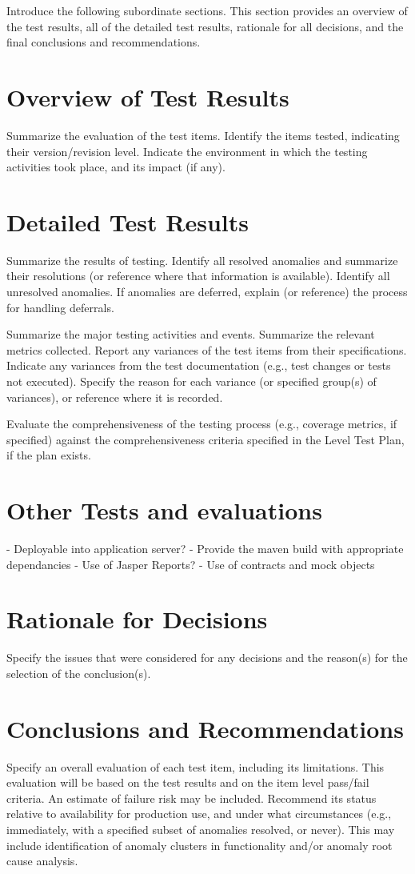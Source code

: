 Introduce the following subordinate sections. This section provides an overview of the test results, all
of the detailed test results, rationale for all decisions, and the final conclusions and recommendations.

\section{Overview of Test Results}
Summarize the evaluation of the test items. Identify the items tested, indicating their version/revision
level. Indicate the environment in which the testing activities took place, and its impact (if any).

\section{Detailed Test Results}
Summarize the results of testing. Identify all resolved anomalies and summarize their resolutions (or
reference where that information is available). Identify all unresolved anomalies. If anomalies are
deferred, explain (or reference) the process for handling deferrals.\par

Summarize the major testing activities and events. Summarize the relevant metrics collected.
Report any variances of the test items from their specifications. Indicate any variances from the test
documentation (e.g., test changes or tests not executed). Specify the reason for each variance (or
specified group(s) of variances), or reference where it is recorded.\par

Evaluate the comprehensiveness of the testing process (e.g., coverage metrics, if specified) against the
comprehensiveness criteria specified in the Level Test Plan, if the plan exists.

\section{Other Tests and evaluations}
- Deployable into application server?
- Provide the maven build with appropriate dependancies
- Use of Jasper Reports?
- Use of contracts and mock objects

\section{Rationale for Decisions}
Specify the issues that were considered for any decisions and the reason(s) for the selection of the
conclusion(s).

\section{Conclusions and Recommendations}
Specify an overall evaluation of each test item, including its limitations. This evaluation will be based
on the test results and on the item level pass/fail criteria. An estimate of failure risk may be included.
Recommend its status relative to availability for production use, and under what circumstances (e.g.,
immediately, with a specified subset of anomalies resolved, or never). This may include identification
of anomaly clusters in functionality and/or anomaly root cause analysis.
